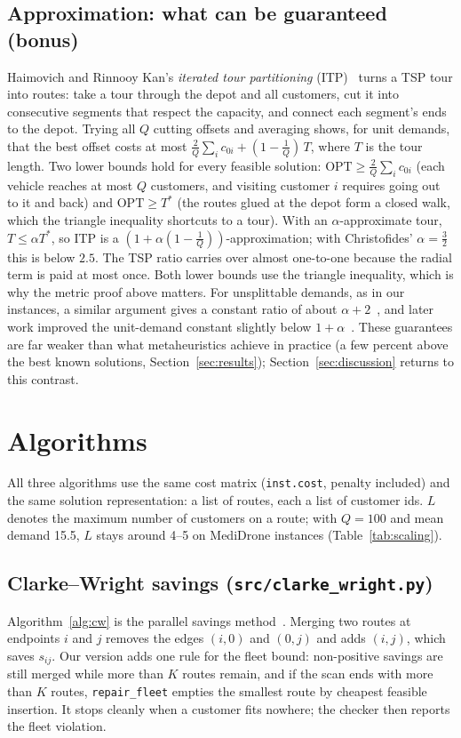 \documentclass[11pt,a4paper]{article}
\theoremstyle{definition}
\theoremstyle{remark}
\newcommand{\code}[1]{\texttt{#1}}
\begin{document}
\subsection{Approximation: what can be guaranteed (bonus)}
Haimovich and Rinnooy Kan's \emph{iterated tour partitioning} (ITP)~\cite{haimovich1985}
turns a TSP tour into routes: take a tour through the depot and all customers, cut it into
consecutive segments that respect the capacity, and connect each segment's ends to the
depot. Trying all $Q$ cutting offsets and averaging shows, for unit demands, that the best
offset costs at most $\tfrac{2}{Q}\sum_i c_{0i} + (1-\tfrac1Q)\,T$, where $T$ is the tour
length. Two lower bounds hold for every feasible solution: $\mathrm{OPT}\ge\tfrac{2}{Q}\sum_i
c_{0i}$ (each vehicle reaches at most $Q$ customers, and visiting customer $i$ requires
going out to it and back) and $\mathrm{OPT}\ge T^*$ (the routes glued at the depot form a
closed walk, which the triangle inequality shortcuts to a tour). With an
$\alpha$-approximate tour, $T\le\alpha T^*$, so ITP is a
$(1+\alpha(1-\tfrac1Q))$-approximation; with Christofides' $\alpha=\tfrac32$ this is below
$2.5$. The TSP ratio carries over almost one-to-one because the radial term is paid at most
once. Both lower bounds use the triangle inequality, which is why the metric proof above
matters. For unsplittable demands, as in our instances, a similar argument gives
a constant ratio of about $\alpha+2$~\cite{altinkemer1987}, and later work
improved the unit-demand constant slightly below $1+\alpha$~\cite{blauth2022}. These
guarantees are far weaker than what metaheuristics achieve in practice (a few percent above
the best known solutions, Section~\ref{sec:results}); Section~\ref{sec:discussion} returns
to this contrast.

\section{Algorithms}\label{sec:methods}
All three algorithms use the same cost matrix (\code{inst.cost}, penalty included) and the
same solution representation: a list of routes, each a list of customer ids. $L$ denotes
the maximum number of customers on a route; with $Q=100$ and mean demand 15.5, $L$ stays
around 4--5 on MediDrone instances (Table~\ref{tab:scaling}).

\subsection{Clarke--Wright savings (\code{src/clarke\_wright.py})}
Algorithm~\ref{alg:cw} is the parallel savings method~\cite{clarke1964}. Merging two
routes at endpoints $i$ and $j$ removes the edges $(i,0)$ and $(0,j)$ and adds $(i,j)$,
which saves $s_{ij}$. Our version adds one rule for the fleet bound: non-positive savings
are still merged while more than $K$ routes remain, and if the scan ends with more than $K$
routes, \code{repair\_fleet} empties the smallest route by cheapest feasible insertion.
It stops cleanly when a customer fits nowhere; the checker then reports the fleet violation.
\end{document}
